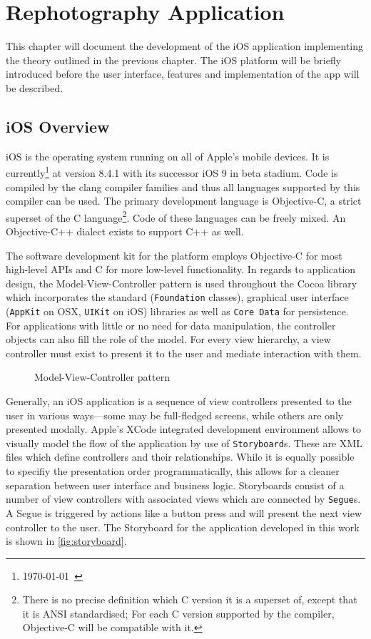 \chapter{Rephotography Application}

This chapter will document the development of the iOS application implementing
the theory outlined in the previous chapter. The iOS platform will be briefly
introduced before the user interface, features and implementation of the app
will be described.

\section{iOS Overview}
\newcommand*{\code}[1]{\texttt{#1}}

iOS is the operating system running on all of Apple's mobile devices. It is
currently\footnote{\today\ \citep{ios8}} at version 8.4.1 with its successor iOS
9 in beta stadium. Code is compiled by the clang compiler families and thus all
languages supported by this compiler can be used. The primary development
language is Objective-C, a strict superset of the C language\footnote{There is
   no precise definition which C version it is a superset of, except that it is
   ANSI standardised; For each C version supported by the compiler, Objective-C
will be compatible with it.}. Code of these languages can be freely mixed. An
Objective-C++ dialect exists to support C++ as well.

The software development kit for the platform employs Objective-C for most
high-level APIs and C for more low-level functionality. In regards to
application design, the Model-View-Controller pattern is used throughout the
Cocoa library which incorporates the standard (\code{Foundation} classes),
graphical user interface (\code{AppKit} on OSX, \code{UIKit} on iOS)
libraries as well as \code{Core Data} for persistence. For applications with
little or no need for data manipulation, the controller objects can also fill
the role of the model.  For every view hierarchy, a view controller must exist
to present it to the user and mediate interaction with them.

\begin{figure}[h]
   {\centering      
      
   \caption{Model-View-Controller pattern}
   \label{fig:mvc}}
\end{figure}

Generally, an iOS application is a sequence of view controllers presented to the
user in various ways---some may be full-fledged screens, while others are only
presented modally. Apple's XCode integrated development environment allows to
visually model the flow of the application by use of \code{Storyboard}s. These
are XML files which define controllers and their relationships. While
it is equally possible to specifiy the presentation order programmatically, this
allows for a cleaner separation between user interface and business logic.
Storyboards consist of a number of view controllers with associated views which
are connected by \code{Segue}s. A Segue is triggered by actions like a button
press and will present the next view controller to the user. The Storyboard for
the application developed in this work is shown in \autoref{fig:storyboard}.

